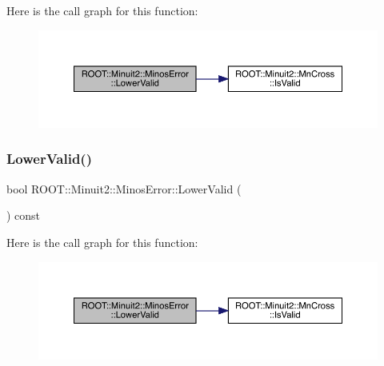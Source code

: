 Here is the call graph for this function\+:
\nopagebreak
\begin{figure}[H]
\begin{center}
\leavevmode
\includegraphics[width=350pt]{d2/dd1/classROOT_1_1Minuit2_1_1MinosError_a4b8c37c90bb53d98d3b4364a5ebc2228_cgraph}
\end{center}
\end{figure}
\mbox{\label{classROOT_1_1Minuit2_1_1MinosError_a4b8c37c90bb53d98d3b4364a5ebc2228}} 
\subsubsection{\texorpdfstring{LowerValid()}{LowerValid()}\hspace{0.1cm}{\footnotesize\ttfamily [3/3]}}
{\footnotesize\ttfamily bool R\+O\+O\+T\+::\+Minuit2\+::\+Minos\+Error\+::\+Lower\+Valid (\begin{DoxyParamCaption}{ }\end{DoxyParamCaption}) const\hspace{0.3cm}{\ttfamily [inline]}}

Here is the call graph for this function\+:
\nopagebreak
\begin{figure}[H]
\begin{center}
\leavevmode
\includegraphics[width=350pt]{d2/dd1/classROOT_1_1Minuit2_1_1MinosError_a4b8c37c90bb53d98d3b4364a5ebc2228_cgraph}
\end{center}
\end{figure}
\mbox{\label{classROOT_1_1Minuit2_1_1MinosError_a109ad5c9e19a97bda32f506718eaef02}} 
